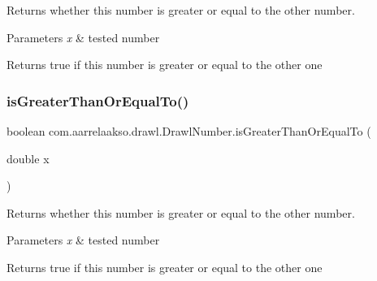 Returns whether this number is greater or equal to the other number. 


\begin{DoxyParams}{Parameters}
{\em x} & tested number \\
\hline
\end{DoxyParams}
\begin{DoxyReturn}{Returns}
true if this number is greater or equal to the other one 
\end{DoxyReturn}
\mbox{\label{classcom_1_1aarrelaakso_1_1drawl_1_1_drawl_number_a2099cd81e0f9834548f8aea7814e9251}} 
\subsubsection{\texorpdfstring{is\+Greater\+Than\+Or\+Equal\+To()}{isGreaterThanOrEqualTo()}\hspace{0.1cm}{\footnotesize\ttfamily [2/2]}}
{\footnotesize\ttfamily boolean com.\+aarrelaakso.\+drawl.\+Drawl\+Number.\+is\+Greater\+Than\+Or\+Equal\+To (\begin{DoxyParamCaption}\item[{double}]{x }\end{DoxyParamCaption})\hspace{0.3cm}{\ttfamily [protected]}}



Returns whether this number is greater or equal to the other number. 


\begin{DoxyParams}{Parameters}
{\em x} & tested number \\
\hline
\end{DoxyParams}
\begin{DoxyReturn}{Returns}
true if this number is greater or equal to the other one 
\end{DoxyReturn}
\mbox{\label{classcom_1_1aarrelaakso_1_1drawl_1_1_drawl_number_ac3253122bbe3bc4946ea8fde1ff95cb4}} 
